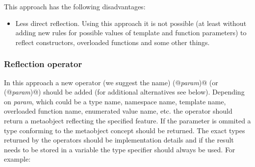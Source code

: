 This approach has the following disadvantages:

\begin{itemize}
	\item Less direct reflection. Using this approach it is not possible
	(at least without adding new rules for possible values of template
	and function parameters) to reflect constructors, overloaded functions
	and some other things.
\end{itemize}

\subsubsection{Reflection operator}

In this approach a new operator (we suggest the name) \verb@mirrored(@{\em param}\verb@)@
(or \verb@reflected(@{\em param}\verb@)@)
should be added (for additional alternatives see below).
Depending on {\em param}, which could be a type name, namespace name,
template name, overloaded function name, enumerated value name, etc. the operator should
return a {} metaobject reflecting the specified feature.
If the parameter is ommited a type conforming to the {} metaobject
concept should be returned.
The exact types returned by the operators should be implementation details and if the
result needs to be stored in a variable the \verb@auto@ type specifier should always
be used.
For example:

